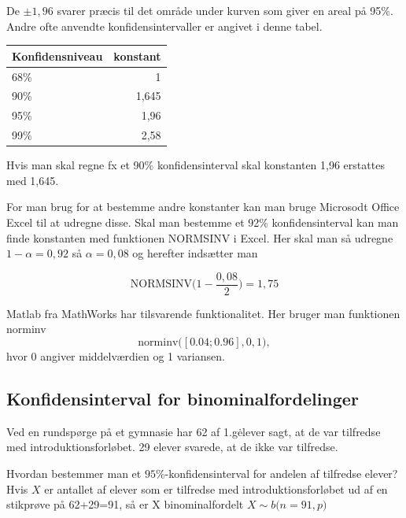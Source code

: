 De \(\pm 1,96\) svarer præcis til det område under kurven som giver en areal
på 95\%. Andre ofte anvendte konfidensintervaller er angivet i denne tabel.

\begin{table}[]
\centering
\begin{tabular}{@{}|l|r|@{}}
\toprule
Konfidensniveau & \multicolumn{1}{l|}{konstant} \\ \midrule
68\%            & 1                             \\ \midrule
90\%            & 1,645                         \\ \midrule
95\%            & 1,96                          \\ \midrule
99\%            & 2,58                          \\ \bottomrule
\end{tabular}
\end{table}

Hvis man skal regne fx et 90\% konfidensinterval skal konstanten 1,96 erstattes med
1,645.

For man brug for at bestemme andre konstanter kan man bruge Microsodt Office Excel
til at udregne disse. Skal man bestemme et 92\% konfidensinterval kan man finde
konstanten med funktionen NORMSINV i Excel. Her skal man så udregne
\(1-\alpha = 0,92\) så \(\alpha = 0,08\) og herefter indsætter man

\begin{equation}
  \mbox{NORMSINV} \Big( 1-\frac{0,08}{2} \Big) = 1,75
\end{equation}

Matlab fra MathWorks har tilsvarende funktionalitet. Her bruger man funktionen
norminv
\begin{equation}
  \mbox{norminv}\big([0.04; 0.96], 0, 1\big),
\end{equation}
hvor 0 angiver middelværdien og 1 variansen.

\subsection{Konfidensinterval for binominalfordelinger}
Ved en rundspørge på et gymnasie har 62 af 1.g\. elever sagt, at de var tilfredse
med introduktionsforløbet. 29 elever svarede, at de ikke var tilfredse.

Hvordan bestemmer man et \(95\%\)-konfidens\-interval for andelen af tilfredse
elever? Hvis \(X\) er antallet af elever som er tilfredse med introduktionsforløbet
ud af en stikprøve på 62+29=91, så er X binominalfordelt
\(X \sim b\big(n=91,p \big)\)

